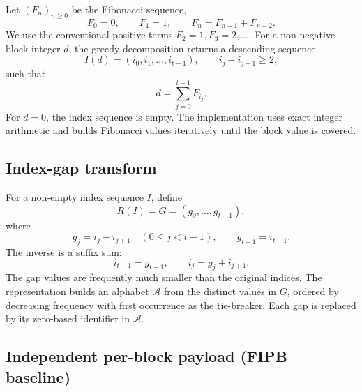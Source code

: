 \documentclass[a4paper,fleqn]{cas-dc}
\begin{document}
Let $(F_n)_{n\geq 0}$ be the Fibonacci sequence,
\begin{equation}
F_0=0,\qquad F_1=1,\qquad F_n=F_{n-1}+F_{n-2}.
\end{equation}
We use the conventional positive terms $F_2=1,F_3=2,\ldots$. For a
non-negative block integer $d$, the greedy decomposition returns a descending
sequence
\begin{equation}
I(d)=(i_0,i_1,\ldots,i_{t-1}), \qquad i_j-i_{j+1}\geq 2,
\end{equation}
such that
\begin{equation}
d=\sum_{j=0}^{t-1}F_{i_j}.
\label{eq:zeckendorf}
\end{equation}
For $d=0$, the index sequence is empty. The implementation uses exact integer
arithmetic and builds Fibonacci values iteratively until the block value is
covered.

\subsection{Index-gap transform}

For a non-empty index sequence $I$, define
\begin{equation}
R(I)=G=(g_0,\ldots,g_{t-1}),
\end{equation}
where
\begin{equation}
g_j=i_j-i_{j+1}\quad(0\leq j<t-1),\qquad
g_{t-1}=i_{t-1}.
\label{eq:gaps}
\end{equation}
The inverse is a suffix sum:
\begin{equation}
i_{t-1}=g_{t-1},\qquad
i_j=g_j+i_{j+1}.
\label{eq:inverse}
\end{equation}
The gap values are frequently much smaller than the original indices. The
representation builds an alphabet $\mathcal{A}$ from the distinct values in
$G$, ordered by decreasing frequency with first occurrence as the tie-breaker.
Each gap is replaced by its zero-based identifier in $\mathcal{A}$.

\subsection{Independent per-block payload (FIPB baseline)}
\label{sec:fipb-payload}
\end{document}
